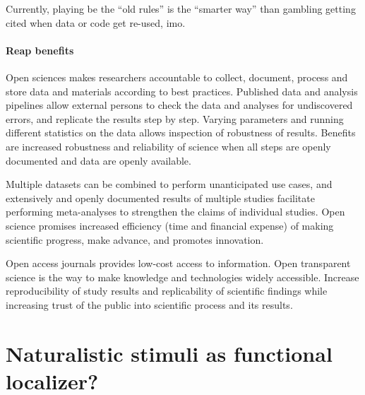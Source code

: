 %
Currently, playing be the ``old rules'' is the ``smarter way'' than gambling
getting cited when data or code get re-used, imo.



\paragraph{Reap benefits}

%
Open sciences makes researchers accountable to collect, document, process and
store data and materials according to best practices.
%
Published data and analysis pipelines allow external persons to check the data
and analyses for undiscovered errors, and replicate the results step by step.
%
Varying parameters and running different statistics on the data allows
inspection of robustness of results.
%
Benefits are increased robustness and reliability of science when all steps are
openly documented and data are openly available.

%
Multiple datasets can be combined to perform unanticipated use cases, and
extensively and openly documented results of multiple studies facilitate
performing meta-analyses to strengthen the claims of individual studies.
%
Open science promises increased efficiency (time and financial expense) of
making scientific progress, make advance, and promotes innovation.

%
Open access journals provides low-cost access to information.
%
Open transparent science is the way to make knowledge and technologies
widely accessible.
%
Increase reproducibility of study results and replicability of scientific
findings while increasing trust of the public into scientific process and its
results.



\pagebreak



\section{Naturalistic stimuli as functional localizer?}



